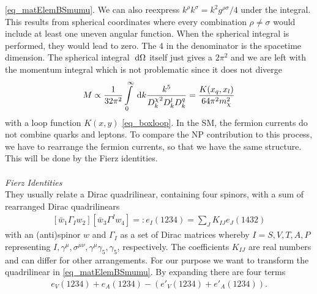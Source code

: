 \eqref{eq_matElemBSmumu}. We can also reexpress $k^\rho k^\sigma = k^2 g^{\rho\sigma}/4$ under the integral. This results from spherical coordinates where
every combination $\rho\neq\sigma$ would include at least one uneven angular function. When the spherical integral is performed, they would lead to zero. The 
4 in the denominator is the spacetime dimension. The spherical integral $\; \mathrm{d} \Omega$ itself just gives a $2\pi^2$ and we are left with the momentum integral
which is not problematic since it does not diverge
\begin{align}
 M \propto \frac{1}{32\pi^2} \int\limits_0^\infty \; \mathrm{d} k \frac{k^5}{{D^\chi_k}^2D^l_k D^q_k} = \frac{K(x_q,x_l)}{64\pi^2 m_\chi^2}
\end{align}
with a loop function $K(x,y)$ \eqref{eq_boxloop}.
In the SM, the fermion currents do not combine quarks and leptons. To compare the NP contribution to this process, we have to rearrange the fermion currents,
so that we have the same structure. This will be done by the Fierz identities.
\\ \\ \noindent \textit{Fierz Identities}\\
They usually relate a Dirac quadrilinear, containing four spinors, with a sum of rearranged Dirac quadrilinears \cite{Fierz}
\begin{align}
  \left[\bar w_1\Gamma_I^{} w_2\right] \left[\bar w_3 \Gamma^I w_4 \right] =: e_I(1234) = \sum\limits_J K_{IJ} e_J(1432)
\end{align}
with an (anti)spinor $w$ and $\Gamma_I$ as a set of Dirac matrices whereby $I=S,V,T,A,P$ representing $I,\gamma^\mu,\sigma^{\mu\nu},\gamma^\mu\gamma_5,\gamma_5$, 
respectively. The coefficients $K_{IJ}$ are real numbers and can differ for other arrangements.
\noindent For our purpose we want to transform the quadrilinear in \eqref{eq_matElemBSmumu}. By expanding there are four terms
\begin{align}
 e_V(1234)+e_A(1234)-\left(e'_V(1234) + e'_A(1234)\right).
 \label{eq_fierz}
\end{align}
